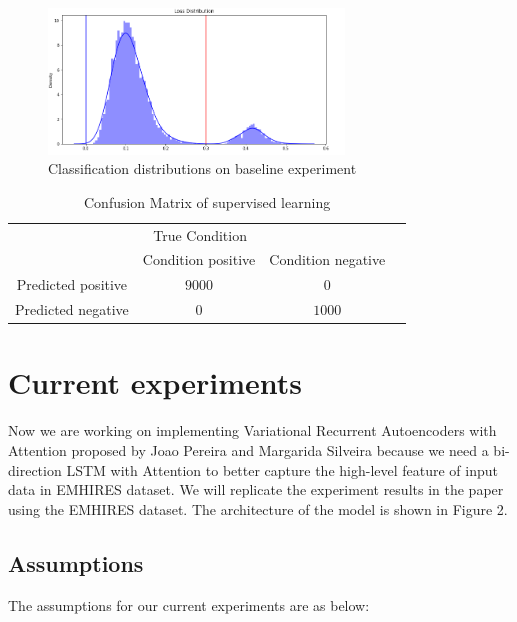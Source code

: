 \documentclass{article}
\begin{document}
\begin{figure}[!t]
    \centering
    \includegraphics[width=0.7\textwidth]{images/Baseline result.png}
    \caption{Classification distributions on baseline experiment}
\end{figure}


\begin{table}
  \caption{Confusion Matrix of supervised learning}
  \label{obd data}
  \centering
  \begin{tabular}{cccc}
    \toprule
    \multicolumn{3}{c}{True Condition}                   \\
    \cmidrule(r){1-3}
    & Condition positive & Condition negative      \\
    \midrule
    Predicted positive & $9000$ & $0$     \\
    Predicted negative & $0$ & $1000$       \\
    \bottomrule
  \end{tabular}
\end{table}

\section{Current experiments}
Now we are working on implementing Variational Recurrent Autoencoders with Attention \cite{AuthorJM} proposed by Joao Pereira and Margarida Silveira because we need a bi-direction LSTM with Attention to better capture the high-level feature of input data in EMHIRES dataset. We will replicate the experiment results in the paper using the EMHIRES dataset. The architecture of the model is shown in Figure 2. 

\subsection{Assumptions}
The assumptions for our current experiments are as below:
\end{document}
